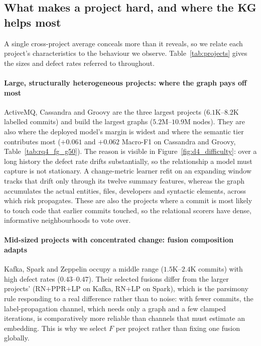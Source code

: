 \documentclass[final,5p,times,twocolumn]{elsarticle}
\theoremstyle{plain}
\begin{document}
\subsection{What makes a project hard, and where the KG helps most}
\label{sec:discuss_difficulty}
A single cross-project average conceals more than it reveals, so we relate each
project's characteristics to the behaviour we observe. Table~\ref{tab:projects} gives
the sizes and defect rates referred to throughout.

\paragraph{Large, structurally heterogeneous projects: where the graph pays off most}
ActiveMQ, Cassandra and Groovy are the three largest projects ($6.1$K--$8.2$K labelled
commits) and build the largest graphs ($5.2$M--$10.9$M nodes). They are also where the
deployed model's margin is widest and where the semantic tier contributes most
($+0.061$ and $+0.062$ Macro-F1 on Cassandra and Groovy, Table~\ref{tab:rq4_fg_g50}).
The reason is visible in Figure~\ref{fig:d4_difficulty}: over a long history the defect
rate drifts substantially, so the relationship a model must capture is not stationary.
A change-metric learner refit on an expanding window tracks that drift only through its
twelve summary features, whereas the graph accumulates the actual entities, files,
developers and syntactic elements, across which risk propagates. These are also the
projects where a commit is most likely to touch code that earlier commits touched, so
the relational scorers have dense, informative neighbourhoods to vote over.

\paragraph{Mid-sized projects with concentrated change: fusion composition adapts}
Kafka, Spark and Zeppelin occupy a middle range ($1.5$K--$2.4$K commits) with high
defect rates ($0.43$--$0.47$). Their selected fusions differ from the larger projects'
(RN$+$PPR$+$LP on Kafka, RN$+$LP on Spark), which is the parsimony rule responding to a
real difference rather than to noise: with fewer commits, the label-propagation channel,
which needs only a graph and a few clamped iterations, is comparatively more reliable
than channels that must estimate an embedding. This is why we select $F$ per project
rather than fixing one fusion globally.
\end{document}
